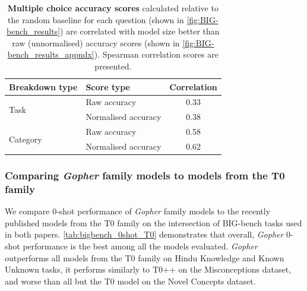 \documentclass[11pt, a4paper, logo, internal, copyright, nonumbering]{deepmind}
\newcommand{\gopher}{\textit{Gopher}\xspace}
\newcommand{\bigbench}{BIG-bench\xspace}
\begin{document}
\begin{table}[ht]
\footnotesize
    \centering
    \begin{tabular}{l|l|c}
Breakdown type & Score type & Correlation \\
\hline
\multirow{2}{*}{Task}       & Raw accuracy    &          0.33 \\
                            & Normalised accuracy &      0.38 \\
\multirow{2}{*}{Category}   & Raw accuracy    &          0.58 \\
                            & Normalised accuracy &      0.62 \\
    \end{tabular}
    \caption{\textbf{Multiple choice accuracy scores} calculated relative to the random baseline for each question (shown in \autoref{fig:BIG-bench_results}) are correlated with model size better than raw (unnormalised) accuracy scores (shown in \autoref{fig:BIG-bench_results_appndx}). Spearman correlation scores are presented.}
    \label{tab:bigbench_score_correlations}
\end{table}



\subsubsection{Comparing \gopher family models to models from the T0 family}
We compare 0-shot performance of \gopher family models to the recently published models from the T0 family \cite{sanh2021multitask} on the intersection of \bigbench tasks used in both papers. \autoref{tab:bigbench_0shot_T0} demonstrates that overall, \gopher 0-shot performance is the best among all the models evaluated. \gopher outperforms all models from the T0 family on Hindu Knowledge and Known Unknown tasks, it performs similarly to T0++ on the Misconceptions dataset, and worse than all but the T0 model on the Novel Concepts dataset. 
\end{document}
